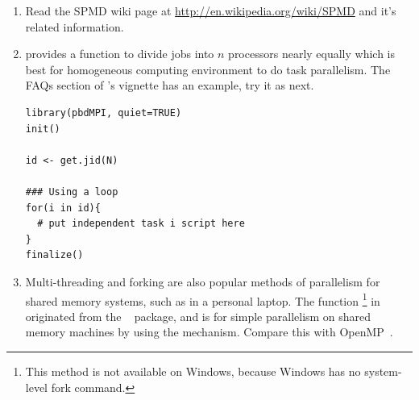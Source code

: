 \begin{enumerate}[label=\thechapter-\arabic*]
\item
Read the SPMD wiki page at \url{http://en.wikipedia.org/wiki/SPMD} and it's related information.


\item \label{ch2:exercise:2}
 provides a function 
to divide  jobs into $n$ processors nearly equally which is best
for homogeneous computing environment to do task parallelism.
The FAQs section of 's vignette has an example, try it as next.
\begin{lstlisting}[language=rr,title=R Code]
library(pbdMPI, quiet=TRUE)
init()

id <- get.jid(N)

### Using a loop
for(i in id){
  # put independent task i script here
}
finalize()
\end{lstlisting}

\item
Multi-threading and 
forking are also popular methods of parallelism for 
shared memory systems, such as in a personal laptop. The function 
\footnote{This method is not 
available on Windows, because Windows has no system-level fork command.} in 
 originated from the
~\citep{multicore}
package, and is for simple parallelism on shared memory machines by using the 
 mechanism. Compare this with 
OpenMP~\citep{OpenMP}.


\end{enumerate}

